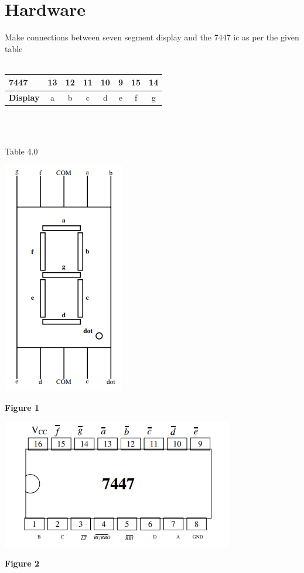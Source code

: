 \documentclass[journal,12pt,twocolumn]{IEEEtran}
\begin{document}
\section{Hardware}
\raggedright
Make connections between seven segment display and the 7447 ic as per the given table\\
\
\centering
\\\begin{tabular}{|l|c|c|c|c|c|c|c|}
\hline
\textbf{7447} & 13 & 12 & 11 & 10 & 9 & 15 & 14\\
\hline
\textbf{Display} & a & b & c & d & e & f & g\\
\hline
\end{tabular}\\
\
\centerline{Table 4.0}


\includegraphics{ss fig.png}
\begin{center}
\textbf{Figure 1}
\end{center}

\includegraphics{ic fig.png}
\begin{center}

\textbf{Figure 2} \\

\end{center}
\centering
\end{document}
